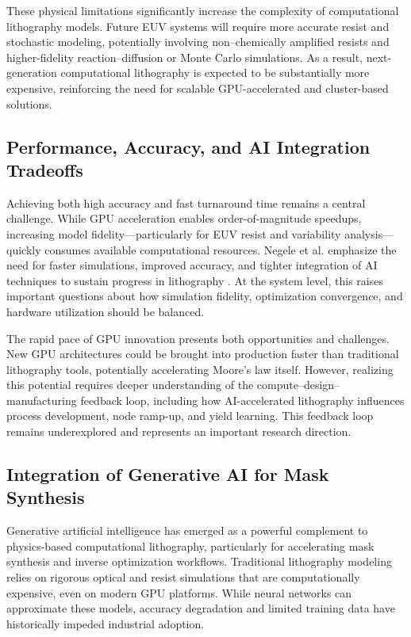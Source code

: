 \documentclass[pdflatex,sn-mathphys-num]{sn-jnl}%
\theoremstyle{thmstyleone}%
\theoremstyle{thmstyletwo}%
\theoremstyle{thmstylethree}%
\begin{document}
These physical limitations significantly increase the complexity of computational lithography models. Future EUV systems will require more accurate resist and stochastic modeling, potentially involving non–chemically amplified resists and higher-fidelity reaction–diffusion or Monte Carlo simulations. As a result, next-generation computational lithography is expected to be substantially more expensive, reinforcing the need for scalable GPU-accelerated and cluster-based solutions.

\subsection{Performance, Accuracy, and AI Integration Tradeoffs}
Achieving both high accuracy and fast turnaround time remains a central challenge. While GPU acceleration enables order-of-magnitude speedups, increasing model fidelity—particularly for EUV resist and variability analysis—quickly consumes available computational resources. Negele et al. emphasize the need for faster simulations, improved accuracy, and tighter integration of AI techniques to sustain progress in lithography \cite{negele2025}. At the system level, this raises important questions about how simulation fidelity, optimization convergence, and hardware utilization should be balanced.

The rapid pace of GPU innovation presents both opportunities and challenges. New GPU architectures could be brought into production faster than traditional lithography tools, potentially accelerating Moore’s law itself. However, realizing this potential requires deeper understanding of the compute–design–manufacturing feedback loop, including how AI-accelerated lithography influences process development, node ramp-up, and yield learning. This feedback loop remains underexplored and represents an important research direction.

\subsection{Integration of Generative AI for Mask Synthesis}
Generative artificial intelligence has emerged as a powerful complement to physics-based computational lithography, particularly for accelerating mask synthesis and inverse optimization workflows. Traditional lithography modeling relies on rigorous optical and resist simulations that are computationally expensive, even on modern GPU platforms. While neural networks can approximate these models, accuracy degradation and limited training data have historically impeded industrial adoption.
\end{document}
